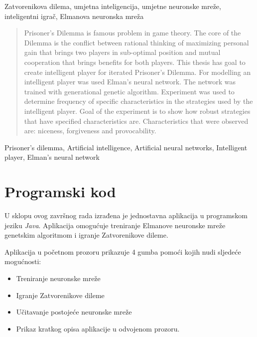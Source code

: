 \documentclass[zavrsnirad]{fer}
\begin{document}
\begin{kljucnerijeci}
	Zatvorenikova dilema, umjetna inteligencija, umjetne neuronske mreže, inteligentni igrač, Elmanova neuronska mreža
\end{kljucnerijeci}


\begin{abstract}
	
	Prisoner's Dilemma is famous problem in game theory. The core of the Dilemma is the conflict between rational thinking of maximizing personal gain that brings two players in sub-optimal position and mutual cooperation that brings benefits for both players. This thesis has goal to create intelligent player for iterated Prisoner's Dilemma. For modelling an intelligent player was used Elman's neural network. The network was trained with generational genetic algorithm. Experiment was used to determine frequency of specific characteristics in the strategies used by the intelligent player. Goal of the experiment is to show how robust strategies that have specified characteristics are. Characteristics that were observed are: niceness, forgiveness and provocability.
	
\end{abstract}

\begin{keywords}
  Prisoner's dilemma, Artificial intelligence, Artificial neural networks, Intelligent player, Elman's neural network
\end{keywords}



\backmatter

\chapter{Programski kod}

	U sklopu ovog završnog rada izrađena je jednostavna aplikacija u programskom jeziku \textit{Java}. Aplikacija omogućuje treniranje Elmanove neuronske mreže genetskim algoritmom i igranje Zatvorenikove dileme.
	
	Aplikacija u početnom prozoru prikazuje 4 gumba pomoći kojih nudi sljedeće mogućnosti:
	\begin{itemize}
		\item Treniranje neuronske mreže
		\item Igranje Zatvorenikove dileme
		\item Učitavanje postojeće neuronske mreže
		\item Prikaz kratkog opisa aplikacije u odvojenom prozoru.
	\end{itemize}
	
\end{document}
